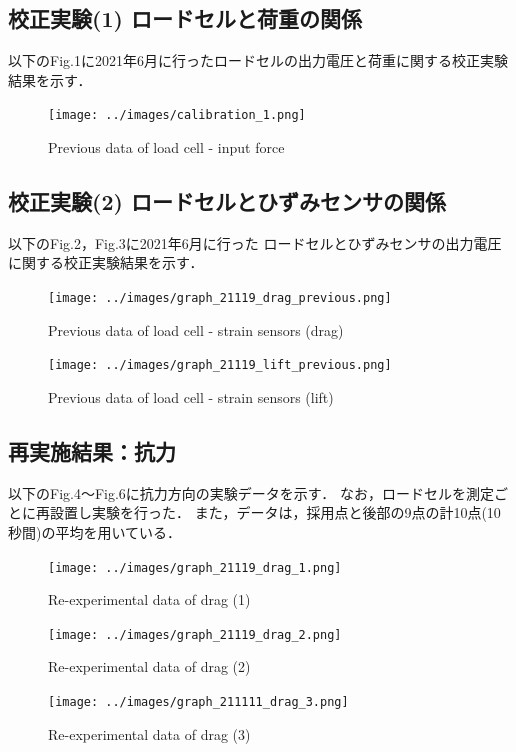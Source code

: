 \documentclass[twocolumn,a4j]{jsarticle}
\begin{document}
\newpage

\subsection{校正実験(1) ロードセルと荷重の関係}
以下のFig.1に2021年6月に行ったロードセルの出力電圧と荷重に関する校正実験結果を示す．

\begin{figure}[htbp]
    \footnotesize
    \begin{center}
        \texttt{[image: ../images/calibration\_1.png]}
        \caption{Previous data of load cell - input force}
    \end{center}
\end{figure}

\subsection{校正実験(2) ロードセルとひずみセンサの関係}
以下のFig.2，Fig.3に2021年6月に行った
ロードセルとひずみセンサの出力電圧に関する校正実験結果を示す．

\begin{figure}[htbp]
    \footnotesize
    \begin{center}
        \texttt{[image: ../images/graph\_21119\_drag\_previous.png]}
        \caption{Previous data of load cell - strain sensors (drag)}
        \texttt{[image: ../images/graph\_21119\_lift\_previous.png]}
        \caption{Previous data of load cell - strain sensors (lift)}
    \end{center}
\end{figure}

\newpage

\subsection{再実施結果：抗力}
以下のFig.4～Fig.6に抗力方向の実験データを示す．
なお，ロードセルを測定ごとに再設置し実験を行った．
また，データは，採用点と後部の9点の計10点(10秒間)の平均を用いている．
\begin{figure}[htbp]
    \footnotesize
    \begin{center}
        \texttt{[image: ../images/graph\_21119\_drag\_1.png]}
        \caption{Re-experimental data of drag (1)}
        \texttt{[image: ../images/graph\_21119\_drag\_2.png]}
        \caption{Re-experimental data of drag (2)}
        \texttt{[image: ../images/graph\_211111\_drag\_3.png]}
        \caption{Re-experimental data of drag (3)}
    \end{center}
\end{figure}
\end{document}
